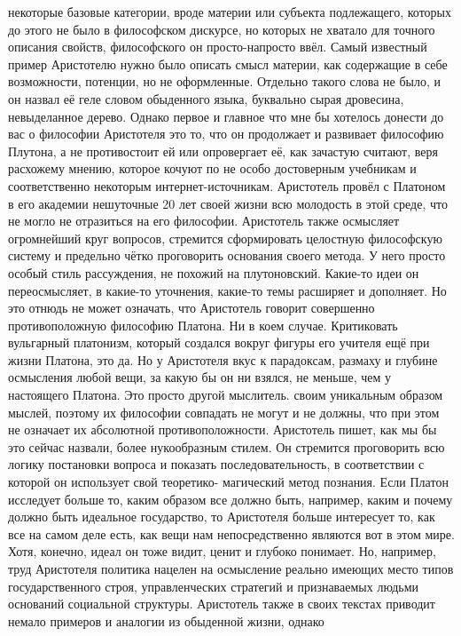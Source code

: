 некоторые базовые категории, вроде материи или субъекта подлежащего, которых до
этого не было в философском дискурсе, но которых не хватало для точного описания
свойств, философского он просто-напросто ввёл. Самый известный пример Аристотелю
нужно было описать смысл материи, как содержащие в себе возможности, потенции,
но не оформленные. Отдельно такого слова не было, и он назвал её геле словом
обыденного языка, буквально сырая дровесина, невыделанное дерево. Однако первое
и главное что мне бы хотелось донести до вас о философии Аристотеля это то, что
он продолжает и развивает философию Плутона, а не противостоит ей или
опровергает её, как зачастую считают, веря расхожему мнению, которое кочуют по
не особо достоверным учебникам и соответственно некоторым интернет-источникам.
Аристотель провёл с Платоном в его академии нешуточные 20 лет своей жизни всю
молодость в этой среде, что не могло не отразиться на его философии. Аристотель
также осмысляет огромнейший круг вопросов, стремится сформировать целостную
философскую систему и предельно чётко проговорить основания своего метода. У
него просто особый стиль рассуждения, не похожий на плутоновский. Какие-то идеи
он переосмысляет, в какие-то уточнения, какие-то темы расширяет и дополняет. Но
это отнюдь не может означать, что Аристотель говорит совершенно противоположную
философию Платона. Ни в коем случае. Критиковать вульгарный платонизм, который
создался вокруг фигуры его учителя ещё при жизни Платона, это да. Но у
Аристотеля вкус к парадоксам, размаху и глубине осмысления любой вещи, за какую
бы он ни взялся, не меньше, чем у настоящего Платона. Это просто другой
мыслитель. своим уникальным образом мыслей, поэтому их философии совпадать не
могут и не должны, что при этом не означает их абсолютной противоположности.
Аристотель пишет, как мы бы это сейчас назвали, более нукообразным стилем. Он
стремится проговорить всю логику постановки вопроса и показать
последовательность, в соответствии с которой он использует свой теоретико-
магический метод познания. Если Платон исследует больше то, каким образом все
должно быть, например, каким и почему должно быть идеальное государство, то
Аристотеля больше интересует то, как все на самом деле есть, как вещи нам
непосредственно являются вот в этом мире. Хотя, конечно, идеал он тоже видит,
ценит и глубоко понимает. Но, например, труд Аристотеля политика нацелен на
осмысление реально имеющих место типов государственного строя, управленческих
стратегий и признаваемых людьми оснований социальной структуры. Аристотель также
в своих текстах приводит немало примеров и аналогии из обыденной жизни, однако
